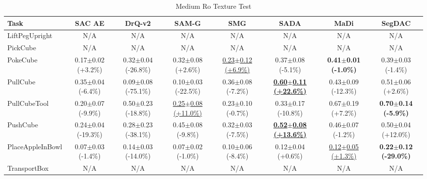 \begin{table}[htbp]
\centering
\scriptsize
\caption{Medium Ro Texture Test}
\label{tab:appendix_rotexturetest_medium}
\begin{adjustbox}{max width=\textwidth}
\begin{tabular}{l*{7}{c}}
\toprule
\textbf{Task} & \textbf{SAC AE} & \textbf{DrQ-v2} & \textbf{SAM-G} & \textbf{SMG} & \textbf{SADA} & \textbf{MaDi} & \textbf{SegDAC} \\
\midrule
LiftPegUpright & N/A & N/A & N/A & N/A & N/A & N/A & N/A \\
PickCube & N/A & N/A & N/A & N/A & N/A & N/A & N/A \\
PokeCube & 0.17$\pm$0.02 \scriptsize{(+3.2\%)} & 0.32$\pm$0.04 \scriptsize{(-26.8\%)} & 0.32$\pm$0.08 \scriptsize{(+2.6\%)} & \underline{0.23$\pm$0.12 \scriptsize{(+6.9\%)}} & 0.37$\pm$0.08 \scriptsize{(-5.1\%)} & \textbf{0.41$\pm$0.01 \scriptsize{(-1.0\%)}} & 0.39$\pm$0.03 \scriptsize{(-1.4\%)} \\
PullCube & 0.35$\pm$0.04 \scriptsize{(-6.4\%)} & 0.09$\pm$0.08 \scriptsize{(-75.1\%)} & 0.10$\pm$0.03 \scriptsize{(-22.5\%)} & 0.36$\pm$0.08 \scriptsize{(-7.2\%)} & \textbf{\underline{0.60$\pm$0.11 \scriptsize{(+22.6\%)}}} & 0.43$\pm$0.09 \scriptsize{(-12.3\%)} & 0.51$\pm$0.06 \scriptsize{(+2.6\%)} \\
PullCubeTool & 0.20$\pm$0.07 \scriptsize{(-9.9\%)} & 0.50$\pm$0.23 \scriptsize{(-18.8\%)} & \underline{0.25$\pm$0.08 \scriptsize{(+11.0\%)}} & 0.23$\pm$0.10 \scriptsize{(-0.7\%)} & 0.33$\pm$0.17 \scriptsize{(-10.8\%)} & 0.67$\pm$0.19 \scriptsize{(+7.2\%)} & \textbf{0.70$\pm$0.14 \scriptsize{(-5.9\%)}} \\
PushCube & 0.24$\pm$0.04 \scriptsize{(-19.3\%)} & 0.28$\pm$0.23 \scriptsize{(-38.1\%)} & 0.45$\pm$0.08 \scriptsize{(-9.8\%)} & 0.32$\pm$0.03 \scriptsize{(-7.5\%)} & \textbf{\underline{0.52$\pm$0.08 \scriptsize{(+13.6\%)}}} & 0.46$\pm$0.07 \scriptsize{(-1.2\%)} & 0.50$\pm$0.04 \scriptsize{(+12.0\%)} \\
PlaceAppleInBowl & 0.07$\pm$0.03 \scriptsize{(-1.4\%)} & 0.14$\pm$0.03 \scriptsize{(-14.0\%)} & 0.07$\pm$0.02 \scriptsize{(-1.0\%)} & 0.10$\pm$0.06 \scriptsize{(-8.4\%)} & 0.12$\pm$0.04 \scriptsize{(+0.6\%)} & \underline{0.12$\pm$0.05 \scriptsize{(+1.3\%)}} & \textbf{0.22$\pm$0.12 \scriptsize{(-29.0\%)}} \\
TransportBox & N/A & N/A & N/A & N/A & N/A & N/A & N/A \\
\bottomrule
\end{tabular}
\end{adjustbox}
\end{table}

